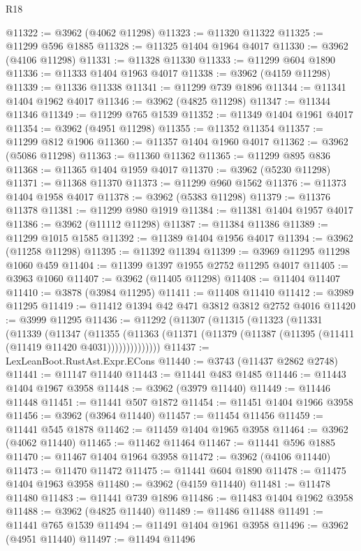 \begin{lexlean}{R18}
\begin{coremodule}
@11322 := @3962 (@4062 @11298)
@11323 := @11320 @11322
@11325 := @11299 @596 @1885
@11328 := @11325 @1404 @1964 @4017
@11330 := @3962 (@4106 @11298)
@11331 := @11328 @11330
@11333 := @11299 @604 @1890
@11336 := @11333 @1404 @1963 @4017
@11338 := @3962 (@4159 @11298)
@11339 := @11336 @11338
@11341 := @11299 @739 @1896
@11344 := @11341 @1404 @1962 @4017
@11346 := @3962 (@4825 @11298)
@11347 := @11344 @11346
@11349 := @11299 @765 @1539
@11352 := @11349 @1404 @1961 @4017
@11354 := @3962 (@4951 @11298)
@11355 := @11352 @11354
@11357 := @11299 @812 @1906
@11360 := @11357 @1404 @1960 @4017
@11362 := @3962 (@5086 @11298)
@11363 := @11360 @11362
@11365 := @11299 @895 @836
@11368 := @11365 @1404 @1959 @4017
@11370 := @3962 (@5230 @11298)
@11371 := @11368 @11370
@11373 := @11299 @960 @1562
@11376 := @11373 @1404 @1958 @4017
@11378 := @3962 (@5383 @11298)
@11379 := @11376 @11378
@11381 := @11299 @980 @1919
@11384 := @11381 @1404 @1957 @4017
@11386 := @3962 (@11112 @11298)
@11387 := @11384 @11386
@11389 := @11299 @1015 @1585
@11392 := @11389 @1404 @1956 @4017
@11394 := @3962 (@11258 @11298)
@11395 := @11392 @11394
@11399 := @3969 @11295 @11298 @1060 @459
@11404 := @11399 @1397 @1955 @2752 @11295 @4017
@11405 := @3963 @1060
@11407 := @3962 (@11405 @11298)
@11408 := @11404 @11407
@11410 := @3878 (@3984 @11295)
@11411 := @11408 @11410
@11412 := @3989 @11295
@11419 := @11412 @1394 @42 @471 @3812 @3812 @2752 @4016
@11420 := @3999 @11295
@11436 := @11292
    (@11307
      (@11315
        (@11323
          (@11331
            (@11339
              (@11347
                (@11355
                  (@11363 (@11371 (@11379 (@11387 (@11395 (@11411 (@11419 @11420 @4031))))))))))))))
@11437 := LexLeanBoot.RustAst.Expr.ECons
@11440 := @3743 (@11437 @2862 @2748)
@11441 := @11147 @11440
@11443 := @11441 @483 @1485
@11446 := @11443 @1404 @1967 @3958
@11448 := @3962 (@3979 @11440)
@11449 := @11446 @11448
@11451 := @11441 @507 @1872
@11454 := @11451 @1404 @1966 @3958
@11456 := @3962 (@3964 @11440)
@11457 := @11454 @11456
@11459 := @11441 @545 @1878
@11462 := @11459 @1404 @1965 @3958
@11464 := @3962 (@4062 @11440)
@11465 := @11462 @11464
@11467 := @11441 @596 @1885
@11470 := @11467 @1404 @1964 @3958
@11472 := @3962 (@4106 @11440)
@11473 := @11470 @11472
@11475 := @11441 @604 @1890
@11478 := @11475 @1404 @1963 @3958
@11480 := @3962 (@4159 @11440)
@11481 := @11478 @11480
@11483 := @11441 @739 @1896
@11486 := @11483 @1404 @1962 @3958
@11488 := @3962 (@4825 @11440)
@11489 := @11486 @11488
@11491 := @11441 @765 @1539
@11494 := @11491 @1404 @1961 @3958
@11496 := @3962 (@4951 @11440)
@11497 := @11494 @11496

\end{coremodule}
\end{lexlean}
